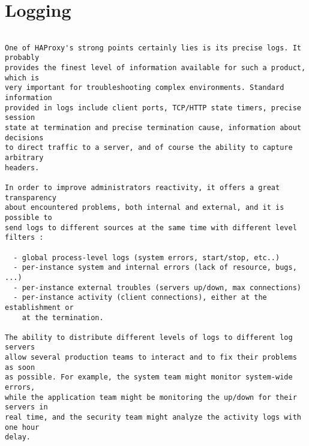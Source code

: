 
\chapter{Logging}

\begin{verbatim}

One of HAProxy's strong points certainly lies is its precise logs. It probably
provides the finest level of information available for such a product, which is
very important for troubleshooting complex environments. Standard information
provided in logs include client ports, TCP/HTTP state timers, precise session
state at termination and precise termination cause, information about decisions
to direct traffic to a server, and of course the ability to capture arbitrary
headers.

In order to improve administrators reactivity, it offers a great transparency
about encountered problems, both internal and external, and it is possible to
send logs to different sources at the same time with different level filters :

  - global process-level logs (system errors, start/stop, etc..)
  - per-instance system and internal errors (lack of resource, bugs, ...)
  - per-instance external troubles (servers up/down, max connections)
  - per-instance activity (client connections), either at the establishment or
    at the termination.

The ability to distribute different levels of logs to different log servers
allow several production teams to interact and to fix their problems as soon
as possible. For example, the system team might monitor system-wide errors,
while the application team might be monitoring the up/down for their servers in
real time, and the security team might analyze the activity logs with one hour
delay.


\end{verbatim}
